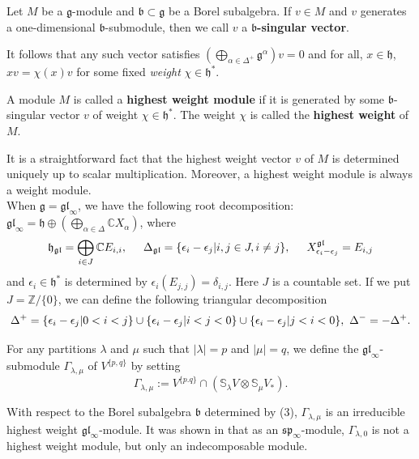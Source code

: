 \begin{defn}
Let $M$ be a $\mathfrak{g}$-module and $\mathfrak{b}\subset\mathfrak{g}$ be a Borel subalgebra.
If $v\in M$ and $v$ generates a one-dimensional $\mathfrak{b}$-submodule, then we call $v$ a  \textbf{$\mathfrak{b}$-singular vector}.
\end{defn}
It follows that any such vector satisfies $(\bigoplus_{\alpha\in\Delta^{+}}\mathfrak{g}^{\alpha})v=0$ and for all, $ x\in\mathfrak{h}$,  $x v=\chi(x)v$ for some fixed \textit{weight} $\chi \in \mathfrak {h}^{*}$.
\begin{defn}
A module $M$ is called a \textbf{highest weight module} if it is generated by some $\mathfrak{b}$-singular vector $v$ of weight $\chi\in \mathfrak{h}^{*}.$ The weight $\chi$ is called the \textbf{highest weight} of $M$.
\end{defn}
It is a straightforward fact that the highest weight vector $v$ of $M$ is determined uniquely up to scalar multiplication. Moreover, a highest weight module is always a weight module.
\\When $\mathfrak{g}=\mathfrak{gl}_{\infty}$, we have the following root decomposition:
$\mathfrak{gl}_{\infty}=\mathfrak{h}\oplus(\bigoplus_{\alpha\in\Delta}\mathbb{C}X_{\alpha})$, where 
$$\mathfrak{h}_{\mathfrak{gl}}=\bigoplus_{i\in J}\mathbb{C}E_{i,i},\hspace{5mm} \Delta_{\mathfrak{gl}}=\{\epsilon_i-\epsilon_j|i,j\in J, i\ne j\},\hspace{5mm} X^{\mathfrak{gl}}_{\epsilon_i-\epsilon_j}=E_{i,j}$$ 
and $\epsilon_{i}\in \mathfrak{h}^{*}$ is determined by $\epsilon_{i}(E_{j,j})=\delta_{i,j}$. Here $J$ is a countable set. If we put $J=\mathbb{Z}/\{0\}$, we can define the following triangular decomposition
\begin{equation}
\Delta^{+}=\{\epsilon_i-\epsilon_j|0<i<j\}\cup\{\epsilon_i-\epsilon_j|i<j<0\}\cup\{\epsilon_i-\epsilon_j|j<i<0\}, \textnormal{ } \Delta^{-}=-\Delta^{+}.
\end{equation}
\begin{defn}
For any partitions $\lambda$ and $\mu$ such that $|\lambda|=p$ and $|\mu|=q$, we define the $\mathfrak{gl}_{\infty}$-submodule  $\Gamma_{\lambda,\mu}$ of $V^{\{p,q\}}$ by setting
$$\Gamma_{\lambda,\mu}:=V^{\{p.q\}}\cap (\mathbb{S}_{\lambda}V\otimes \mathbb{S}_{\mu}V_{*}).$$
\end{defn} 
With respect to the Borel subalgebra $\mathfrak{b}$ determined by (3), $\Gamma_{\lambda,\mu}$ is an irreducible highest weight $\mathfrak{gl}_{\infty}$-module. It was shown in \cite{styrk} that as an $\mathfrak{sp}_{\infty}$-module, $\Gamma_{\lambda,0}$ is not a highest weight module, but only an indecomposable module.
